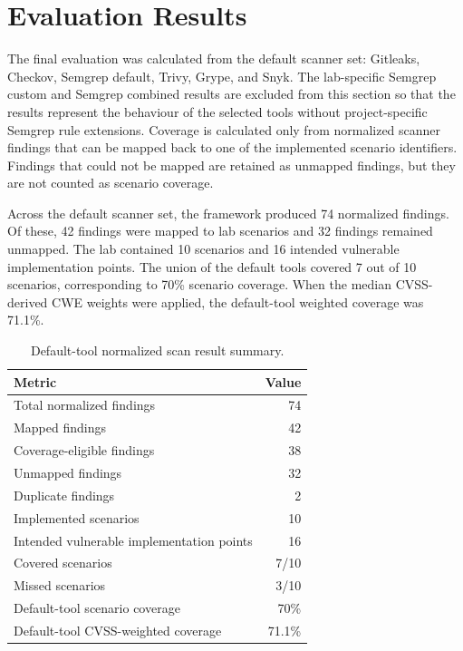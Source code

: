 \section{Evaluation Results}
\label{sec:evaluation-results}

The final evaluation was calculated from the default scanner set: Gitleaks, Checkov, Semgrep default, Trivy, Grype, and Snyk. The lab-specific Semgrep custom and Semgrep combined results are excluded from this section so that the results represent the behaviour of the selected tools without project-specific Semgrep rule extensions. Coverage is calculated only from normalized scanner findings that can be mapped back to one of the implemented scenario identifiers. Findings that could not be mapped are retained as unmapped findings, but they are not counted as scenario coverage.

Across the default scanner set, the framework produced 74 normalized findings. Of these, 42 findings were mapped to lab scenarios and 32 findings remained unmapped. The lab contained 10 scenarios and 16 intended vulnerable implementation points. The union of the default tools covered 7 out of 10 scenarios, corresponding to 70\% scenario coverage. When the median CVSS-derived CWE weights were applied, the default-tool weighted coverage was 71.1\%.

\begin{table}[H]
\centering
\caption{Default-tool normalized scan result summary.}
\label{tab:default-overall-normalized-results}
\begin{tabular}{lr}
\hline
Metric & Value \\
\hline
Total normalized findings & 74 \\
Mapped findings & 42 \\
Coverage-eligible findings & 38 \\
Unmapped findings & 32 \\
Duplicate findings & 2 \\
Implemented scenarios & 10 \\
Intended vulnerable implementation points & 16 \\
Covered scenarios & 7/10 \\
Missed scenarios & 3/10 \\
Default-tool scenario coverage & 70\% \\
Default-tool CVSS-weighted coverage & 71.1\% \\
\hline
\end{tabular}
\end{table}

